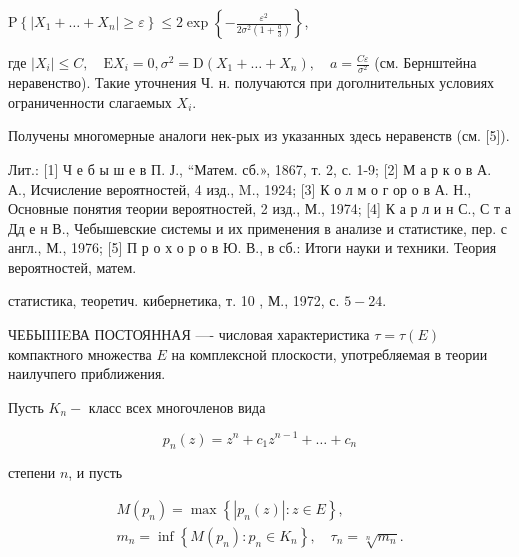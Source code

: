 \documentclass[10pt]{article}
\begin{document}
$\mathrm{P}\left\{\left|X_{1}+\ldots+X_{n}\right| \geqslant \varepsilon\right\} \leqslant 2 \exp \left\{-\frac{\varepsilon^{2}}{2 \sigma^{2}\left(1+\frac{a}{3}\right)}\right\}$,



где $\left|X_{i}\right| \leqslant C, \quad \mathrm{E} X_{i}=0, \sigma^{2}=\mathrm{D}\left(X_{1}+\ldots+X_{n}\right), \quad a=\frac{C \varepsilon}{\sigma^{2}}$ (см. Бернштейна неравенство). Такие уточнения Ч. н. получаются при доголнительных условиях ограниченности слагаемых $X_{i}$.



Получены многомерные аналоги нек-рых из указанных здесь неравенств (см. [5]).



Лит.: [1] Ч е б ы ш е в П. Ј., “Матем. сб.», 1867, т. 2, с. 1-9; [2] М а р к о в А. А., Исчисление вероятностей, 4 изд., M., 1924; [3] К о л м о г ор о в А. Н., Основные понятия теории вероятностей, 2 изд., М., 1974; [4] К а р л и н С., С т а Дд е н В., Чебышевские системы и их применения в анализе и статистике, пер. с англ., М., 1976; [5] П р о х о р о в Ю. В., в сб.: Итоги науки и техники. Теория вероятностей, матем.

статистика, теоретич. кибернетика, т. 10 , М., 1972, с. $5-24$.



ЧЕБЫIIIEВА ПОСТОЯННАЯ —- числовая характеристика $\tau=\tau(E)$ компактного множества $E$ на комплексной плоскости, употребляемая в теории наилучпего приближения.



Пусть $K_{n}-$ класс всех многочленов вида



\[

p_{n}(z)=z^{n}+c_{1} z^{n-1}+\ldots+c_{n}

\]



степени $n$, и пусть



\[

\begin{gathered}

M\left(p_{n}\right)=\max \left\{\left|p_{n}(z)\right|: z \in E\right\}, \\

m_{n}=\inf \left\{M\left(p_{n}\right): p_{n} \in K_{n}\right\}, \quad \tau_{n}=\sqrt[n]{m_{n}} .

\end{gathered}

\]
\end{document}
